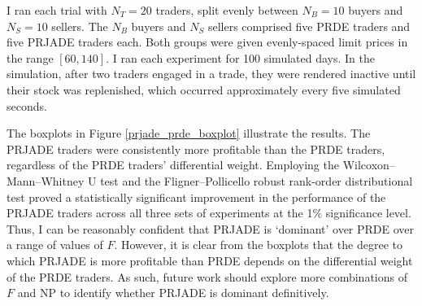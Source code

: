\documentclass[conference]{IEEEtran}
\begin{document}
I ran each trial with $N_T=20$ traders, split evenly between $N_B=10$ buyers and $N_S=10$ sellers.
The $N_B$ buyers and $N_S$ sellers comprised five PRDE traders and five PRJADE traders each.
Both groups were given evenly-spaced limit prices in the range $[60,140]$.
I ran each experiment for 100 simulated days.
In the simulation, after two traders engaged in a trade, they were rendered inactive until their stock was replenished, which occurred approximately every five simulated seconds.

The boxplots in Figure \ref{prjade_prde_boxplot} illustrate the results.
The PRJADE traders were consistently more profitable than the PRDE traders, regardless of the PRDE traders' differential weight.
Employing the Wilcoxon--Mann--Whitney U test and the Fligner--Pollicello robust rank-order distributional test proved a statistically significant improvement in the performance of the PRJADE traders across all three sets of experiments at the 1\% significance level.
Thus, I can be reasonably confident that PRJADE is `dominant' over PRDE over a range of values of $F$.
However, it is clear from the boxplots that the degree to which PRJADE is more profitable than PRDE depends on the differential weight of the PRDE traders.
As such, future work should explore more combinations of $F$ and $\mathrm{NP}$ to identify whether PRJADE is dominant definitively.
\end{document}
